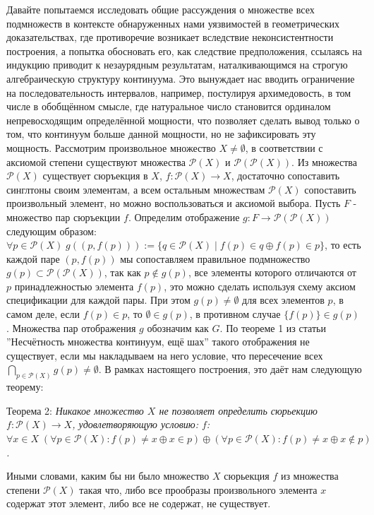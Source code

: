 \documentclass[12pt]{article}
\begin{document}
Давайте попытаемся исследовать общие рассуждения о множестве всех подмножеств в контексте обнаруженных нами уязвимостей в геометрических доказательствах, где противоречие возникает вследствие неконсистентности построения, а попытка обосновать его, как следствие предположения, ссылаясь на индукцию приводит к незаурядным результатам, наталкивающимся на строгую алгебраическую структуру континуума. Это вынуждает нас вводить ограничение на последовательность интервалов, например, постулируя архимедовость, в том числе в обобщённом смысле, где натуральное число становится ординалом непревосходящим определённой мощности, что позволяет сделать вывод только о том, что континуум больше данной мощности, но не зафиксировать эту мощность. Рассмотрим произвольное множество $X \neq \emptyset$, в соответствии с аксиомой степени существуют множества $\mathcal{P}(X)$ и $\mathcal{P}(\mathcal{P}(X))$. Из множества $\mathcal{P}(X)$ существует сюръекция в $X$, $f : \mathcal{P}(X) \to X$, достаточно сопоставить синглтоны своим элементам, а всем остальным множествам $\mathcal{P}(X)$ сопоставить произвольный элемент, но можно воспользоваться и аксиомой выбора. Пусть $F$ - множество пар сюръекции $f$. Определим отображение $g : F \to \mathcal{P}(\mathcal{P}(X))$ следующим образом: $\forall p \in \mathcal{P}(X) \; g((p, f(p))) := \{ q \in \mathcal{P}(X) \mid f(p) \in q \oplus f(p) \in p \}$, то есть каждой паре $(p, f(p))$ мы сопоставляем правильное подмножество $g(p) \subset \mathcal{P}(\mathcal{P}(X))$, так как $p \notin g(p)$, все элементы которого отличаются от $p$ принадлежностью элемента $f(p)$, это можно сделать используя схему аксиом спецификации для каждой пары. При этом $g(p) \neq \emptyset$ для всех элементов $p$, в самом деле, если $f(p) \in p$, то $\emptyset \in g(p)$, в противном случае $\{ f(p) \} \in g(p)$. Множества пар отображения $g$ обозначим как $G$. По теореме 1 из статьи ''Несчётность множества континуум, ещё шах'' такого отображения не существует, если мы накладываем на него условие, что пересечение всех $\bigcap\limits_{p \in \mathcal{P}(X)} g(p) \neq \emptyset$. В рамках настоящего построения, это даёт нам следующую теорему:

Теорема 2: {\sl Никакое множество $X$ не позволяет определить сюрьекцию $f : \mathcal{P}(X) \to X$, удовлетворяющую условию: $f$: $\forall x \in X \; (\forall p \in \mathcal{P}(X) : f(p) \neq x \oplus x \in p) \oplus (\forall p \in \mathcal{P}(X) : f(p) \neq x \oplus x \notin p)$.}

Иными словами, каким бы ни было множество $X$ сюрьекция $f$ из множества степени $\mathcal{P}(X)$ такая что, либо все прообразы произвольного элемента $x$ содержат этот элемент, либо все не содержат, не существует.
\end{document}

